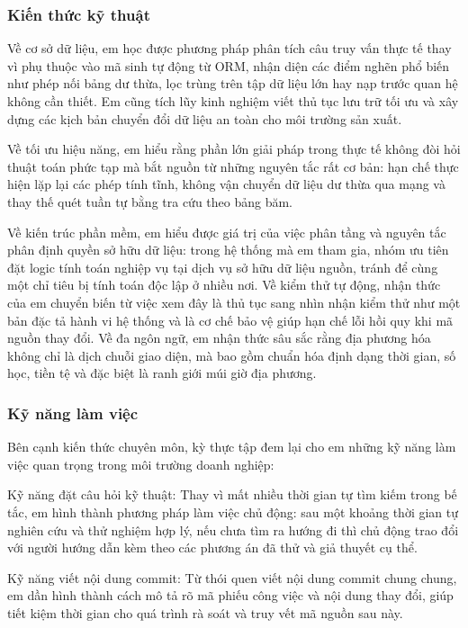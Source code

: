 \subsubsection{Kiến thức kỹ thuật}

Về cơ sở dữ liệu, em học được phương pháp phân tích câu truy vấn thực tế thay vì phụ thuộc vào mã sinh tự động từ ORM, nhận diện các điểm nghẽn phổ biến như phép nối bảng dư thừa, lọc trùng trên tập dữ liệu lớn hay nạp trước quan hệ không cần thiết. Em cũng tích lũy kinh nghiệm viết thủ tục lưu trữ tối ưu và xây dựng các kịch bản chuyển đổi dữ liệu an toàn cho môi trường sản xuất.

Về tối ưu hiệu năng, em hiểu rằng phần lớn giải pháp trong thực tế không đòi hỏi thuật toán phức tạp mà bắt nguồn từ những nguyên tắc rất cơ bản: hạn chế thực hiện lặp lại các phép tính tĩnh, không vận chuyển dữ liệu dư thừa qua mạng và thay thế quét tuần tự bằng tra cứu theo bảng băm.

Về kiến trúc phần mềm, em hiểu được giá trị của việc phân tầng và nguyên tắc phân định quyền sở hữu dữ liệu: trong hệ thống mà em tham gia, nhóm ưu tiên đặt logic tính toán nghiệp vụ tại dịch vụ sở hữu dữ liệu nguồn, tránh để cùng một chỉ tiêu bị tính toán độc lập ở nhiều nơi. Về kiểm thử tự động, nhận thức của em chuyển biến từ việc xem đây là thủ tục sang nhìn nhận kiểm thử như một bản đặc tả hành vi hệ thống và là cơ chế bảo vệ giúp hạn chế lỗi hồi quy khi mã nguồn thay đổi. Về đa ngôn ngữ, em nhận thức sâu sắc rằng địa phương hóa không chỉ là dịch chuỗi giao diện, mà bao gồm chuẩn hóa định dạng thời gian, số học, tiền tệ và đặc biệt là ranh giới múi giờ địa phương.

\subsubsection{Kỹ năng làm việc}

Bên cạnh kiến thức chuyên môn, kỳ thực tập đem lại cho em những kỹ năng làm việc quan trọng trong môi trường doanh nghiệp:

Kỹ năng đặt câu hỏi kỹ thuật: Thay vì mất nhiều thời gian tự tìm kiếm trong bế tắc, em hình thành phương pháp làm việc chủ động: sau một khoảng thời gian tự nghiên cứu và thử nghiệm hợp lý, nếu chưa tìm ra hướng đi thì chủ động trao đổi với người hướng dẫn kèm theo các phương án đã thử và giả thuyết cụ thể.

Kỹ năng viết nội dung commit: Từ thói quen viết nội dung commit chung chung, em dần hình thành cách mô tả rõ mã phiếu công việc và nội dung thay đổi, giúp tiết kiệm thời gian cho quá trình rà soát và truy vết mã nguồn sau này.

